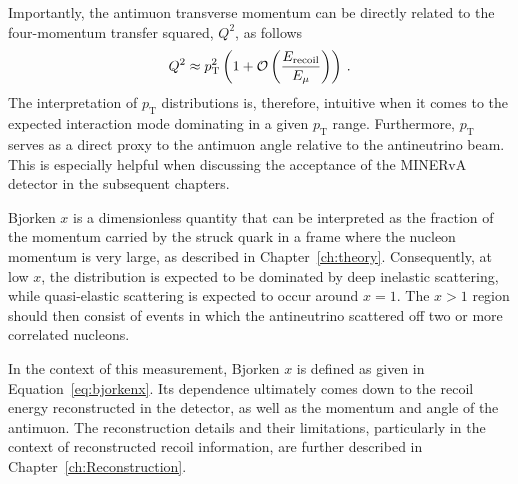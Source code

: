 Importantly, the antimuon transverse momentum can be directly related to the four-momentum transfer squared, $Q^2$, as follows
\vspace{-5pt}
\begin{equation}
    Q^2 \approx p_{\text{T}}^2\left(1 + \mathcal{O}\left(\frac{E_\text{recoil}}{E_\mu}\right)\right) \hspace{2pt}.
    \vspace{-7pt}
\end{equation}
The interpretation of $p_{\text{T}}$ distributions is, therefore, intuitive when it comes to the expected interaction mode dominating in a given $p_{\text{T}}$ range. Furthermore, $p_{\text{T}}$ serves as a direct proxy to the antimuon angle relative to the antineutrino beam. This is especially helpful when discussing the acceptance of the MINERvA detector in the subsequent chapters.

Bjorken $x$ is a dimensionless quantity that can be interpreted as the fraction of the momentum carried by the struck quark in a frame where the nucleon momentum is very large, as described in Chapter~\ref{ch:theory}. Consequently, at low $x$, the distribution is expected to be dominated by deep inelastic scattering, while quasi-elastic scattering is expected to occur around $x = 1$. The $x > 1$ region should then consist of events in which the antineutrino scattered off two or more correlated nucleons.

In the context of this measurement, Bjorken $x$ is defined as given in Equation~\ref{eq:bjorkenx}. Its dependence ultimately comes down to the recoil energy reconstructed in the detector, as well as the momentum and angle of the antimuon. The reconstruction details and their limitations, particularly in the context of reconstructed recoil information, are further described in Chapter~\ref{ch:Reconstruction}.

